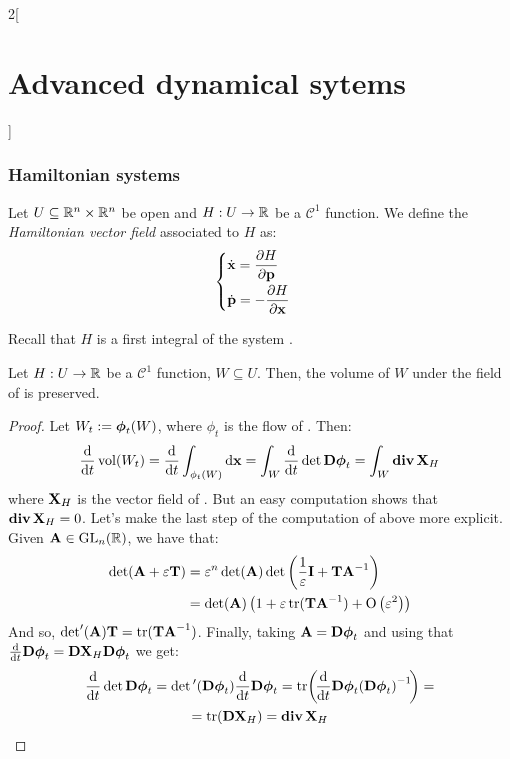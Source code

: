 \documentclass[../../../main_math.tex]{subfiles}
\begin{document}
\begin{multicols}{2}[\section{Advanced dynamical sytems}]
  \subsubsection{Hamiltonian systems}
  \begin{definition}
    Let $U\subseteq \mathbb{R}^n\times \mathbb{R}^n$ be open and $H:U\rightarrow \mathbb{R}$ be a $\mathcal{C}^1$ function. We define the \emph{Hamiltonian vector field} associated to $H$ as:
    \begin{equation}\label{ADS:ham_system}
      \begin{cases}
        \displaystyle\dot{\vf{x}}=\pdv{H}{\vf{p}}\vspace{0.1cm} \\
        \displaystyle\dot{\vf{p}}=-\pdv{H}{\vf{x}}
      \end{cases}
    \end{equation}
  \end{definition}
  \begin{remark}
    Recall that $H$ is a first integral of the system .
  \end{remark}
  \begin{lemma}
    Let $H:U\rightarrow \mathbb{R}$ be a $\mathcal{C}^1$ function, $W\subseteq U$. Then, the volume of $W$ under the field of  is preserved.
  \end{lemma}
  \begin{proof}
    Let $W_t:=\boldsymbol{\mathrm{\phi}}_t(W)$, where $\phi_t$ is the flow of . Then:
    \begin{equation*}
      \dv{}{t}\operatorname{vol}(W_t)=\dv{}{t}\int_{\phi_t(W)}\dd{\boldsymbol{\mathrm{x}}}=\int_W\dv{}{t}\det \boldsymbol{\mathrm{D\phi}}_t=\int_W\operatorname{\boldsymbol{\mathrm{div}}} \boldsymbol{\mathrm{X}}_H
    \end{equation*}
    where $\boldsymbol{\mathrm{X}}_H$ is the vector field of . But an easy computation shows that $\operatorname{\boldsymbol{\mathrm{div}}} \boldsymbol{\mathrm{X}}_H=0$. Let's make the last step of the computation of above more explicit. Given $\boldsymbol{\mathrm{A}}\in \mathrm{GL}_n(\mathbb{R})$, we have that:
    \begin{align*}
      \det(\vf{A} + \varepsilon \vf{T}) & = \varepsilon^n\det(\vf{A})\det\left(\frac{1}{\varepsilon} \vf{I} + \vf{T} \vf{A}^{-1}\right) \\
                                        & =\det(\vf{A})\left(1+\varepsilon\trace(\vf{T}\vf{A}^{-1})+\O{\varepsilon^2}\right)
    \end{align*}
    And so, $\det'(\vf{A})\vf{T}=\trace(\vf{T}\vf{A}^{-1})$. Finally, taking $\boldsymbol{\mathrm{A}}=\boldsymbol{\mathrm{D\phi}}_t$ and using that $\dv{}{t}\boldsymbol{\mathrm{D\phi}}_t=\boldsymbol{\mathrm{DX}}_H \boldsymbol{\mathrm{D\phi}}_t$ we get:
    \begin{multline*}
      \dv{}{t}\det \vf{D\phi}_t=\det\empty{}'(\vf{D\phi}_t)\dv{}{t}\vf{D\phi}_t=\trace\!\left(\!\dv{}{t}\vf{D\phi}_t {(\vf{D\phi}_t)}^{-1}\!\right)=\\=\trace(\vf{DX}_H) = \div \vf{X}_H
    \end{multline*}
  \end{proof}

\end{multicols}
\end{document}

